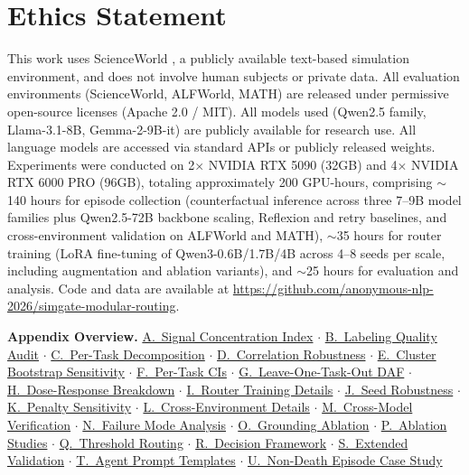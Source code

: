 \documentclass[11pt]{article}
\begin{document}
\section*{Ethics Statement}

This work uses ScienceWorld \citep{scienceworld-2022}, a publicly available text-based simulation environment, and does not involve human subjects or private data. All evaluation environments (ScienceWorld, ALFWorld, MATH) are released under permissive open-source licenses (Apache 2.0 / MIT). All models used (Qwen2.5 family, Llama-3.1-8B, Gemma-2-9B-it) are publicly available for research use. All language models are accessed via standard APIs or publicly released weights. Experiments were conducted on 2$\times$ NVIDIA RTX 5090 (32GB) and 4$\times$ NVIDIA RTX 6000 PRO (96GB), totaling approximately 200 GPU-hours, comprising ${\sim}$140 hours for episode collection (counterfactual inference across three 7--9B model families plus Qwen2.5-72B backbone scaling, Reflexion and retry baselines, and cross-environment validation on ALFWorld and MATH), ${\sim}$35 hours for router training (LoRA fine-tuning of Qwen3-0.6B/1.7B/4B across 4--8 seeds per scale, including augmentation and ablation variants), and ${\sim}$25 hours for evaluation and analysis. Code and data are available at \url{https://github.com/anonymous-nlp-2026/simgate-modular-routing}.



\appendix

\noindent\textbf{Appendix Overview.}
\hyperref[app:sci]{A.~Signal Concentration Index} $\cdot$
\hyperref[app:labeling]{B.~Labeling Quality Audit} $\cdot$
\hyperref[app:per-task]{C.~Per-Task Decomposition} $\cdot$
\hyperref[app:correlation]{D.~Correlation Robustness} $\cdot$
\hyperref[app:wild-cluster]{E.~Cluster Bootstrap Sensitivity} $\cdot$
\hyperref[app:per-task-ci]{F.~Per-Task CIs} $\cdot$
\hyperref[app:loto-daf]{G.~Leave-One-Task-Out DAF} $\cdot$
\hyperref[app:dose-response]{H.~Dose-Response Breakdown} $\cdot$
\hyperref[app:router-details]{I.~Router Training Details} $\cdot$
\hyperref[app:seed-robustness]{J.~Seed Robustness} $\cdot$
\hyperref[app:penalty]{K.~Penalty Sensitivity} $\cdot$
\hyperref[app:cross-env-details]{L.~Cross-Environment Details} $\cdot$
\hyperref[app:cross-model]{M.~Cross-Model Verification} $\cdot$
\hyperref[app:failure-modes]{N.~Failure Mode Analysis} $\cdot$
\hyperref[app:grounding-ablation]{O.~Grounding Ablation} $\cdot$
\hyperref[app:ablations]{P.~Ablation Studies} $\cdot$
\hyperref[sec:threshold-routing]{Q.~Threshold Routing} $\cdot$
\hyperref[app:decision-framework]{R.~Decision Framework} $\cdot$
\hyperref[app:extended-validation]{S.~Extended Validation} $\cdot$
\hyperref[app:prompt-templates]{T.~Agent Prompt Templates} $\cdot$
\hyperref[app:non-death-case-study]{U.~Non-Death Episode Case Study}
\end{document}
